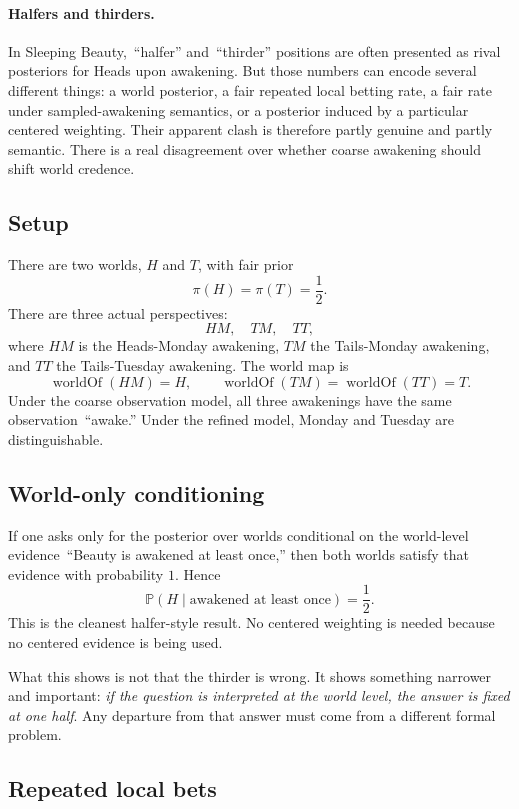\documentclass[11pt]{article}
\newcommand{\Pp}{\mathbb{P}}
\newcommand{\1}{\mathbf{1}}
\begin{document}
\paragraph{Halfers and thirders.} In Sleeping Beauty, \,``halfer'' and \,``thirder'' positions are often presented as rival posteriors for Heads upon awakening. 
But those numbers can encode several different things: a world posterior, a fair repeated local betting rate, a fair rate under sampled-awakening semantics, or a posterior induced by a particular centered weighting. 
Their apparent clash is therefore partly genuine and partly semantic. There is a real disagreement over whether coarse awakening should shift world credence. 

\subsection{Setup}

There are two worlds, $H$ and $T$, with fair prior
\[
\pi(H)=\pi(T)=\frac{1}{2}.
\]
There are three actual perspectives:
\[
HM,\quad TM,\quad TT,
\]
where $HM$ is the Heads-Monday awakening, $TM$ the Tails-Monday awakening, and $TT$ the Tails-Tuesday awakening. The world map is
\[
\operatorname{worldOf}(HM)=H,\qquad \operatorname{worldOf}(TM)=\operatorname{worldOf}(TT)=T.
\]
Under the coarse observation model, all three awakenings have the same observation \,``awake.'' Under the refined model, Monday and Tuesday are distinguishable.

\subsection{World-only conditioning}

If one asks only for the posterior over worlds conditional on the world-level evidence \,``Beauty is awakened at least once,'' then both worlds satisfy that evidence with probability $1$. Hence
\[
\Pp(H \mid \text{awakened at least once}) = \frac{1}{2}.
\]
This is the cleanest halfer-style result. No centered weighting is needed because no centered evidence is being used.

What this shows is not that the thirder is wrong. It shows something narrower and important: \emph{if the question is interpreted at the world level, the answer is fixed at one half}. Any departure from that answer must come from a different formal problem.

\subsection{Repeated local bets}
\end{document}
